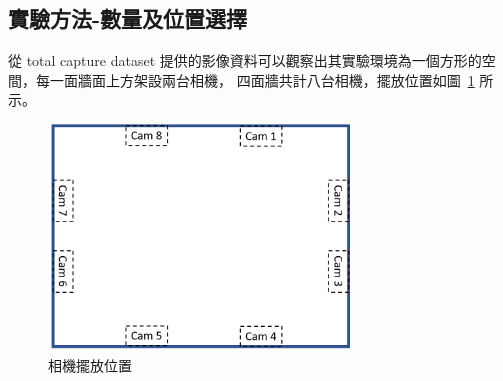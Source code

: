 \subsection{實驗方法-數量及位置選擇}
從 total capture dataset 提供的影像資料可以觀察出其實驗環境為一個方形的空間，每一面牆面上方架設兩台相機，
四面牆共計八台相機，擺放位置如圖~\ref{ch3_fig_cameraset_totalcap} 所示。
\begin{figure}[!ht]
   \centering
   \includegraphics[width=8cm]{figure/ch3_fig_cameraset_totalcap.png}
    \caption[相機擺放位置]{相機擺放位置}
    \label{ch3_fig_cameraset_totalcap}
\end{figure}

